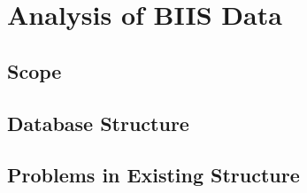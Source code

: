 
\chapter{Analysis of BIIS Data} %

\label{Analysis of BIIS Data} %




\section{Scope}


\section{Database Structure}

\section{Problems in Existing Structure}

